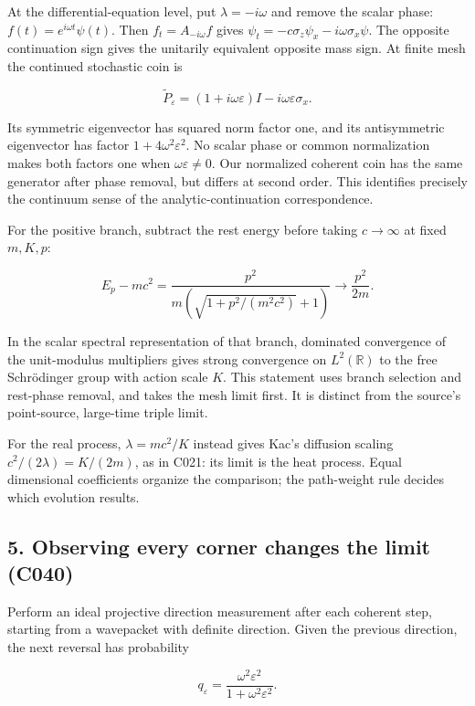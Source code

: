 \documentclass[11pt,a4paper]{article}
\begin{document}
At the differential-equation level, put \(\lambda=-i\omega\) and remove
the scalar phase: \(f(t)=e^{i\omega t}\psi(t)\). Then
\(f_t=A_{-i\omega}f\) gives
\(\psi_t=-c\sigma_z\psi_x-i\omega\sigma_x\psi\). The opposite
continuation sign gives the unitarily equivalent opposite mass sign. At
finite mesh the continued stochastic coin is

\[
\widetilde P_\varepsilon=(1+i\omega\varepsilon)I
-i\omega\varepsilon\sigma_x.
\]

Its symmetric eigenvector has squared norm factor one, and its
antisymmetric eigenvector has factor \(1+4\omega^2\varepsilon^2\). No
scalar phase or common normalization makes both factors one when
\(\omega\varepsilon\ne0\). Our normalized coherent coin has the same
generator after phase removal, but differs at second order. This
identifies precisely the continuum sense of the analytic-continuation
correspondence.

For the positive branch, subtract the rest energy before taking
\(c\to\infty\) at fixed \(m,K,p\):

\[
E_p-mc^2=\frac{p^2}{m(\sqrt{1+p^2/(m^2c^2)}+1)}
\longrightarrow\frac{p^2}{2m}.
\]

In the scalar spectral representation of that branch, dominated
convergence of the unit-modulus multipliers gives strong convergence on
\(L^2(\mathbb R)\) to the free Schrödinger group with action scale
\(K\). This statement uses branch selection and rest-phase removal, and
takes the mesh limit first. It is distinct from the source's
point-source, large-time triple limit.

For the real process, \(\lambda=mc^2/K\) instead gives Kac's diffusion
scaling \(c^2/(2\lambda)=K/(2m)\), as in C021: its limit is the heat
process. Equal dimensional coefficients organize the comparison; the
path-weight rule decides which evolution results.

\hypertarget{observing-every-corner-changes-the-limit-c040}{%
\subsection{5. Observing every corner changes the limit
(C040)}\label{observing-every-corner-changes-the-limit-c040}}

Perform an ideal projective direction measurement after each coherent
step, starting from a wavepacket with definite direction. Given the
previous direction, the next reversal has probability

\[
q_\varepsilon=\frac{\omega^2\varepsilon^2}
 {1+\omega^2\varepsilon^2}.
\]
\end{document}
